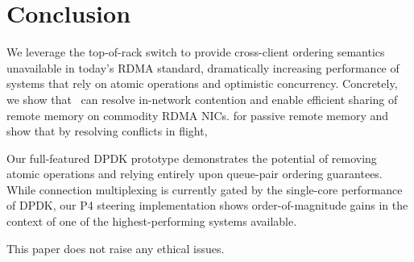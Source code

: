 \section{Conclusion}

We leverage the top-of-rack switch to provide cross-client
ordering semantics unavailable in today's RDMA standard,
dramatically increasing performance of systems that rely on
atomic operations and optimistic concurrency.  Concretely,
we show that \sword\ can resolve in-network contention and
enable efficient sharing of remote memory on commodity RDMA
NICs.  for passive remote memory and show that by resolving
conflicts in flight,

 Our full-featured DPDK prototype demonstrates the potential of
 removing atomic operations and relying entirely upon queue-pair
 ordering guarantees.  While connection multiplexing is currently
 gated by the single-core performance of DPDK, our P4 steering
 implementation shows order-of-magnitude gains in the context of one
 of the highest-performing systems available.

 This paper does not raise any ethical issues.
